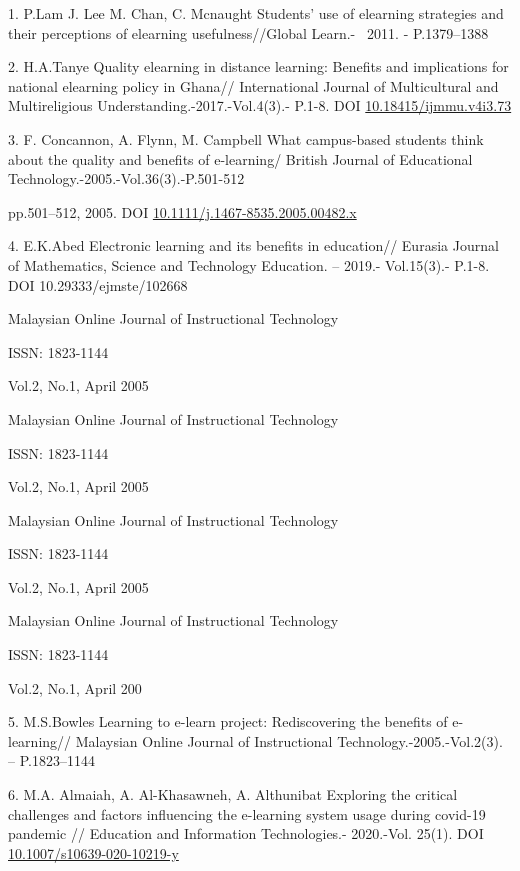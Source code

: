 \begin{references}
1. P.Lam J. Lee M. Chan, C. Mcnaught Students' use of elearning
strategies and their perceptions of elearning usefulness//Global
Learn.-\emph{~} 2011. - P.1379--1388

2. H.A.Tanye Quality elearning in distance learning: Benefits and
implications for national elearning policy in Ghana// International
Journal of Multicultural and Multireligious
Understanding.-2017.-Vol.4(3).- P.1-8. DOI
\href{http://dx.doi.org/10.18415/ijmmu.v4i3.73}{10.18415/ijmmu.v4i3.73}

3. F. Concannon, A. Flynn, M. Campbell What campus-based students think
about the quality and benefits of e-learning/ British Journal of
Educational Technology.-2005.-Vol.36(3).-P.501-512

pp.501--512, 2005. DOI
\href{http://dx.doi.org/10.1111/j.1467-8535.2005.00482.x}{10.1111/j.1467-8535.2005.00482.x}

4. E.K.Abed Electronic learning and its benefits in education// Eurasia
Journal of Mathematics, Science and Technology Education. -- 2019.-
Vol.15(3).- P.1-8. DOI 10.29333/ejmste/102668

Malaysian Online Journal of Instructional Technology

ISSN: 1823-1144

Vol.2, No.1, April 2005

Malaysian Online Journal of Instructional Technology

ISSN: 1823-1144

Vol.2, No.1, April 2005

Malaysian Online Journal of Instructional Technology

ISSN: 1823-1144

Vol.2, No.1, April 2005

Malaysian Online Journal of Instructional Technology

ISSN: 1823-1144

Vol.2, No.1, April 200

5. M.S.Bowles Learning to e-learn project: Rediscovering the benefits of
e-learning// Malaysian Online Journal of Instructional
Technology.-2005.-Vol.2(3). -- P.1823--1144

6. M.A. Almaiah, A. Al-Khasawneh, A. Althunibat Exploring the critical
challenges and factors influencing the e-learning system usage during
covid-19 pandemic // Education and Information Technologies.- 2020.-Vol.
25(1). DOI
\href{https://link.springer.com/article/10.1007/s10639-020-10219-y}{10.1007/s10639-020-10219-y}


\end{references}
